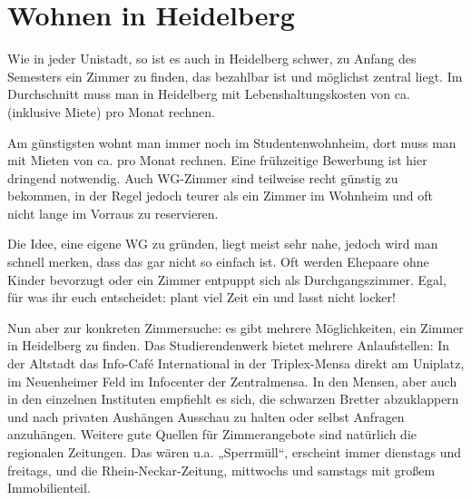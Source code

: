 \section{Wohnen in Heidelberg}


Wie in jeder Unistadt, so ist es auch in Heidelberg schwer, zu Anfang des Semesters ein Zimmer zu finden, das bezahlbar ist und möglichst zentral liegt. Im Durchschnitt muss man in Heidelberg mit Lebenshaltungskosten von ca. \lebenshaltungskosten (inklusive Miete) pro Monat rechnen.

Am günstigsten wohnt man immer noch im Studentenwohnheim, dort muss man mit Mieten von ca. \studentenwohnheim pro Monat rechnen. Eine frühzeitige Bewerbung ist hier dringend notwendig. Auch WG-Zimmer sind teilweise recht günstig zu bekommen, in der Regel jedoch teurer als ein Zimmer im Wohnheim und oft nicht lange im Vorraus zu reservieren.

Die Idee, eine eigene WG zu gründen, liegt meist sehr nahe, jedoch wird man schnell merken, dass das gar nicht so einfach ist. Oft werden Ehepaare ohne Kinder bevorzugt oder ein Zimmer entpuppt sich als Durchgangszimmer. Egal, für was ihr euch entscheidet: plant viel Zeit ein und lasst nicht locker!

Nun aber zur konkreten Zimmersuche: es gibt mehrere Möglichkeiten, ein Zimmer in Heidelberg zu finden. Das Studierendenwerk bietet mehrere Anlaufstellen: In der Altstadt das Info-Café International in der Triplex-Mensa direkt am Uniplatz, im Neuenheimer Feld im Infocenter der Zentralmensa. In den Mensen, aber auch in den einzelnen Instituten empfiehlt es sich, die schwarzen Bretter abzuklappern und nach privaten Aushängen Ausschau zu halten oder selbst Anfragen anzuhängen. Weitere gute Quellen für Zimmerangebote sind natürlich die regionalen Zeitungen. Das wären u.a. „Sperrmüll“, erscheint immer dienstags und freitags, und die Rhein-Neckar-Zeitung, mittwochs und samstags mit großem Immobilienteil. %

